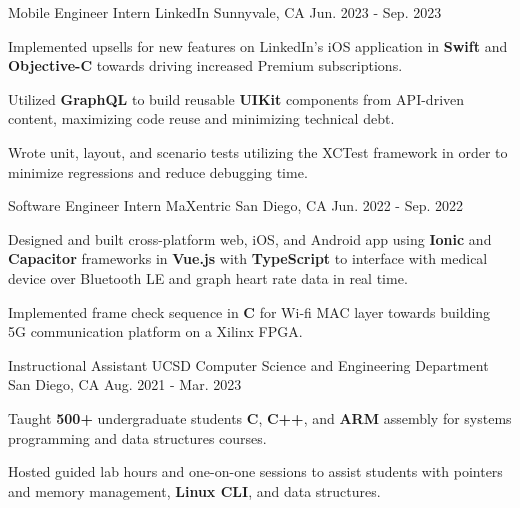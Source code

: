 

\begin{cventries}

\cventry
  {Mobile Engineer Intern} %
  {LinkedIn} %
  {Sunnyvale, CA} %
  {Jun. 2023 - Sep. 2023} %
  {
    \begin{cvitems} %
      \item {Implemented upsells for new features on LinkedIn’s iOS application in \textbf{Swift} and \textbf{Objective-C} towards driving increased Premium subscriptions. }
      \item {Utilized \textbf{GraphQL} to build reusable \textbf{UIKit} components from API-driven content, maximizing code reuse and minimizing technical debt.}
      \item {Wrote unit, layout, and scenario tests utilizing the XCTest framework in order to minimize regressions and reduce debugging time.}
    \end{cvitems}
  }


\cventry
  {Software Engineer Intern} %
  {MaXentric} %
  {San Diego, CA} %
  {Jun. 2022 - Sep. 2022} %
  {
    \begin{cvitems} %
      \item {Designed and built cross-platform web, iOS, and Android app using \textbf{Ionic} and \textbf{Capacitor} frameworks in \textbf{Vue.js} with \textbf{TypeScript} to interface with medical device over Bluetooth LE and graph heart rate data in real time.}
      \item {Implemented frame check sequence in \textbf{C} for Wi‐fi MAC layer towards building 5G communication platform on a Xilinx FPGA.}
    \end{cvitems}
  }


\cventry
  {Instructional Assistant} %
  {UCSD Computer Science and Engineering Department} %
  {San Diego, CA} %
  {Aug. 2021 - Mar. 2023} %
  {
    \begin{cvitems} %
      \item {Taught \textbf{500+} undergraduate students \textbf{C}, \textbf{C++}, and \textbf{ARM} assembly for systems programming and data structures courses.}
      \item {Hosted guided lab hours and one-on-one sessions to assist students with pointers and memory management, \textbf{Linux CLI}, and data structures.}
    \end{cvitems}
  }



\end{cventries}
